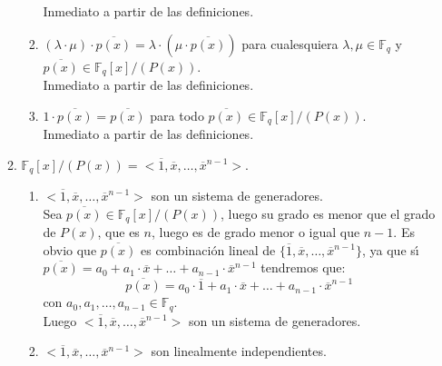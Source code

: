 \begin{enumerate}
\begin{enumerate}
\begin{enumerate}
Inmediato a partir de las definiciones.\\
\item $(\lambda\cdot\mu)\cdot \overline{p(x)}=\lambda\cdot(\mu\cdot
\overline{p(x)})$ para cualesquiera $\lambda,\mu\in \mathbb{F}_q$ y
$\overline{p(x)}\in \mathbb{F}_q[x]/(P(x))$.\\

Inmediato a partir de las definiciones.\\
\item $1\cdot \overline{p(x)}= \overline{p(x)}$ para todo
$\overline{p(x)}\in\mathbb{F}_q[x]/(P(x))$.\\

Inmediato a partir de las definiciones.\\
\end{enumerate}
%
\newpage
%
\item $\mathbb{F}_q[x]/(P(x))=<\overline{1},\overline{x},\dots,
\overline{x}^{n-1}>$.\\
\begin{enumerate}
\item $<\overline{1},\overline{x},\dots,\overline{x}^{n-1}>$ son un sistema de
generadores.\\

Sea $\overline{p(x)}\in \mathbb{F}_q[x]/(P(x))$, luego su grado es menor que
el grado de $P(x)$, que es $n$, luego es de grado menor o igual que $n-1$.
Es obvio que $\overline{p(x)}$ es combinaci\'on lineal de
$\{\overline{1},\overline{x},\dots,\overline{x}^{n-1}\}$, ya que s\'{\i}
$\overline{p(x)}=a_0+a_1\cdot\overline{x}+\dots+a_{n-1}\cdot\overline{x}^{n-1}$
tendremos que:
\begin{displaymath}
\overline{p(x)} = a_0\cdot \overline{1}+a_1\cdot \overline{x}+\dots+a_{n-1}\cdot
\overline{x}^{n-1}
\end{displaymath}
con $a_0,a_1,\dots,a_{n-1}\in \mathbb{F}_q$.\\

Luego $<\overline{1},\overline{x},\dots,\overline{x}^{n-1}>$ son un sistema
de generadores.\\
\item  $<\overline{1},\overline{x},\dots,\overline{x}^{n-1}>$ son linealmente
independientes.\\


\end{enumerate}
\end{enumerate}
\end{enumerate}
